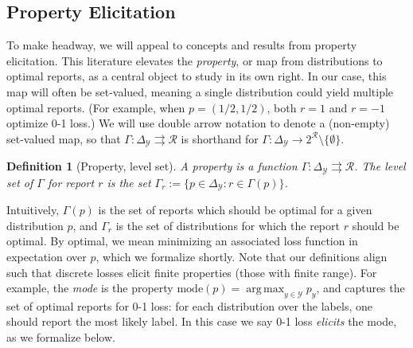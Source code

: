 \documentclass[11pt]{article}
\newcommand{\Comments}{1}
\newcommand{\mytodo}[2]{\ifnum\Comments=1%
  \todo[linecolor=#1!80!black,backgroundcolor=#1,bordercolor=#1!80!black]{#2}\fi}
\newcommand{\raft}[1]{\mytodo{green!20!white}{RF: #1}}
\newcommand{\jessiet}[1]{\mytodo{teal!20!white}{JF: #1}}
\newcommand{\mode}{\mathrm{mode}}
\newcommand{\simplex}{\Delta_\Y}
\newcommand{\R}{\mathcal{R}}
\newcommand{\Y}{\mathcal{Y}}
\newcommand{\toto}{\rightrightarrows}
\DeclareMathOperator*{\argmax}{arg\,max}
\newtheorem{definition}{Definition}
\begin{document}
\subsection{Property Elicitation}
\label{sec:property-elicitation}

To make headway, we will appeal to concepts and results from property elicitation.
This literature elevates the \emph{property}, or map from distributions to optimal reports, as a central object to study in its own right.
In our case, this map will often be set-valued, meaning a single distribution could yield multiple optimal reports.
(For example, when $p=(1/2,1/2)$, both $r=1$ and $r=-1$ optimize 0-1 loss.)
We will use double arrow notation to denote a (non-empty) set-valued map, so that $\Gamma: \simplex \toto \R$ is shorthand for $\Gamma: \simplex \to 2^{\R} \setminus \{\emptyset\}$.

\begin{definition}[Property, level set]\label{def:property}
  A \emph{property} is a function $\Gamma:\simplex\toto\R$.
  The \emph{level set} of $\Gamma$ for report $r$ is the set $\Gamma_r := \{p \in \simplex : r \in \Gamma(p)\}$.
\end{definition}

Intuitively, $\Gamma(p)$ is the set of reports which should be optimal for a given distribution $p$, and $\Gamma_r$ is the set of distributions for which the report $r$ should be optimal.
By optimal, we mean minimizing an associated loss function in expectation over $p$, which we formalize shortly.
Note that our definitions align such that discrete losses elicit finite properties (those with finite range). %
For example, the \emph{mode} is the %
property $\mode(p) = \argmax_{y\in\Y} p_y$, and captures the set of optimal reports for 0-1 loss: for each distribution over the labels, one should report the most likely label.
In this case we say 0-1 loss \emph{elicits} the mode, as we formalize below.
\end{document}
